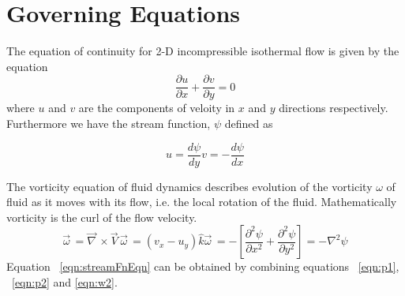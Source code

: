\documentclass{article}
\begin{document}
\section{Governing Equations}
The equation of continuity for 2-D incompressible isothermal flow  \citep{Pedlosky, anderson1995computational} is given by the equation
\begin{equation}
\label{eqn:continuityEqn}
\frac{\partial u}{\partial x} + \frac{\partial v}{\partial y} = 0  
\end{equation}
where $u$ and $v$ are the components of veloity in $x$ and $y$ directions respectively. Furthermore we have the stream function, $\psi$ defined as

\begin{subequations}
\begin{equation}
\label{eqn:p1}
u = \frac{d\psi}{dy} 
\end{equation}
\begin{equation}
\label{eqn:p2}
v = -\frac{d\psi}{dx}
\end{equation}
\end{subequations}

The vorticity equation of fluid dynamics describes evolution of the vorticity $\omega$ of fluid as it moves with its flow, i.e. the local rotation of the fluid. Mathematically vorticity is the curl of the flow velocity.
\begin{subequations}
\begin{equation}
\label{eqn:w1}
\vec{\omega}^{\,} = \vec{\nabla}^{\,} \times \vec{V}^{\,}
\end{equation}
\begin{equation}
\label{eqn:w2}
\vec{\omega}^{\,} = (v_x - u_y)\hat{k}
\end{equation}
\begin{equation}
\label{eqn:streamFnEqn}
\vec{\omega}^{\,} = -\left[\frac{\partial^2 \psi}{\partial x^2} +  \frac{\partial^2 \psi}{\partial y^2}\right]=-\nabla^2 \psi
\end{equation}
\end{subequations}
Equation  ~\ref{eqn:streamFnEqn} can be obtained by combining equations ~\ref{eqn:p1}, ~\ref{eqn:p2} and \ref{eqn:w2}.
\end{document}
